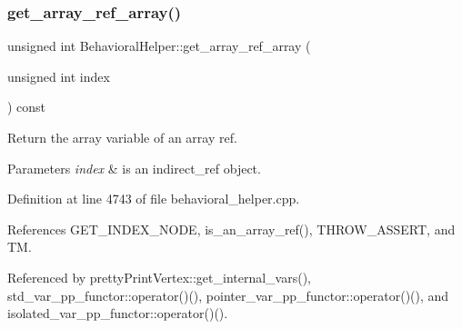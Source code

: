 \subsubsection{\texorpdfstring{get\+\_\+array\+\_\+ref\+\_\+array()}{get\_array\_ref\_array()}}
{\footnotesize\ttfamily unsigned int Behavioral\+Helper\+::get\+\_\+array\+\_\+ref\+\_\+array (\begin{DoxyParamCaption}\item[{unsigned int}]{index }\end{DoxyParamCaption}) const\hspace{0.3cm}{\ttfamily [virtual]}}



Return the array variable of an array ref. 


\begin{DoxyParams}{Parameters}
{\em index} & is an indirect\+\_\+ref object. \\
\hline
\end{DoxyParams}


Definition at line 4743 of file behavioral\+\_\+helper.\+cpp.



References G\+E\+T\+\_\+\+I\+N\+D\+E\+X\+\_\+\+N\+O\+DE, is\+\_\+an\+\_\+array\+\_\+ref(), T\+H\+R\+O\+W\+\_\+\+A\+S\+S\+E\+RT, and TM.



Referenced by pretty\+Print\+Vertex\+::get\+\_\+internal\+\_\+vars(), std\+\_\+var\+\_\+pp\+\_\+functor\+::operator()(), pointer\+\_\+var\+\_\+pp\+\_\+functor\+::operator()(), and isolated\+\_\+var\+\_\+pp\+\_\+functor\+::operator()().

